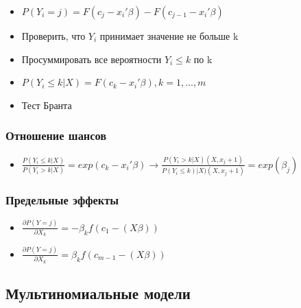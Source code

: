 \documentclass[a4paper, 12pt]{article}
\begin{document}
\begin{itemize}
    \item $P(Y_{i} = j) = F(c_{j} - x_{i}'\beta) - F(c_{j-1} - x_{i}'\beta)$
    \item Проверить, что $Y_{i}$ принимает значение не больше k
    \item Просуммировать все вероятности $Y_{i} \leq k$ по k
    \item $P(Y_{i} \leq k|X) = F(c_{k} - x_{i}'\beta), k = 1, ..., m$
    \item Тест Бранта
\end{itemize}

\subsubsection{Отношение шансов}

\begin{itemize}
    \item $\frac{P(Y_{i} \leq k|X)}{P(Y_{i} > k|X)} = exp(c_{k} - x_{i}'\beta) \rightarrow \frac{P(Y_{i} > k|X)(X, x_{j} + 1)}{P(Y_{i} \leq k)|X)(X, x_{j} + 1)} = exp(\beta_{j})$
\end{itemize}

\subsubsection{Предельные эффекты}

\begin{itemize}
    \item $\frac{\partial P(Y = j)}{\partial X_{k}} = -\beta_{k}f(c_{1} - (X\beta))$
    \item $\frac{\partial P(Y = j)}{\partial X_{k}} = \beta_{k}f(c_{m-1} - (X\beta))$
\end{itemize}

\subsection{Мультиномиальные модели}
\end{document}
